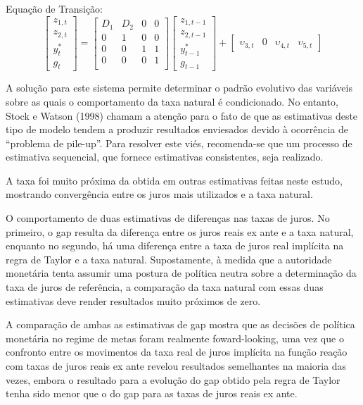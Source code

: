 Equação de Transição:
$$ \begin{bmatrix}
    z_{1,t} \\ z_{2,t} \\ y_{t}^{*} \\ g_t
\end{bmatrix} = \left[ \begin{array}{cccc}
    D_1 & D_2 & 0 & 0  \\
     0  &  1 & 0 & 0  \\
     0  &  0 & 1 & 1  \\
     0  &  0 & 0 & 1  \\
\end{array} \right] \left[ \begin{array}{c}
       z_{1,t-1} \\ z_{2,t-1} \\ y_{t-1}^{*} \\ g_{t-1}
\end{array} \right] + \left[\begin{array}{c}
     \upsilon_{3,t} & 0 & \upsilon_{4,t} & \upsilon_{5,t}
\end{array}  \right]
$$

A solução para este sistema permite determinar o padrão evolutivo das variáveis sobre as quais o comportamento da taxa natural é condicionado. No entanto, Stock e Watson (1998) chamam a atenção para o fato de que as estimativas deste tipo de modelo tendem a produzir resultados enviesados devido à ocorrência de “problema de pile-up”. Para resolver este viés, recomenda-se que um processo de estimativa sequencial, que fornece estimativas consistentes, seja realizado.

A taxa foi muito próxima da obtida em outras estimativas feitas neste estudo, mostrando convergência entre os juros mais utilizados e a taxa natural.

O comportamento de duas estimativas de diferenças nas taxas de juros. No primeiro, o gap resulta da diferença entre os juros reais ex ante e a taxa natural, enquanto no segundo, há uma diferença entre a taxa de juros real implícita na regra de Taylor e a taxa natural. Supostamente, à medida que a autoridade monetária tenta assumir uma postura de política neutra sobre a determinação da taxa de juros de referência, a comparação da taxa natural com essas duas estimativas deve render resultados muito próximos de zero.

A comparação de ambas as estimativas de gap mostra que as decisões de política monetária no regime de metas foram realmente foward-looking, uma vez que o confronto entre os movimentos da taxa real de juros implícita na função reação com taxas de juros reais ex ante revelou resultados semelhantes na maioria das vezes, embora o resultado para a evolução do gap obtido pela regra de Taylor tenha sido menor que o do gap para as taxas de juros reais ex ante.

